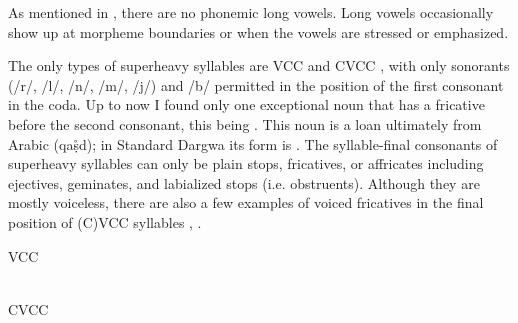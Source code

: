 As mentioned in , there are no phonemic long vowels. Long vowels occasionally show up at morpheme boundaries or when the vowels are stressed or emphasized.

The only types of superheavy syllables are VCC  and CVCC , with only sonorants (/r/, /l/, /n/, /m/, /j/) and /b/ permitted in the position of the first consonant in the coda. Up to now I found only one exceptional noun that has a fricative before the second consonant, this being  . This noun is a loan ultimately from Arabic (qaṣ̊d); in Standard Dargwa its form is . The syllable-final consonants of superheavy syllables can only be plain stops, fricatives, or affricates including ejectives, geminates, and labialized stops (i.e. obstruents). Although they are mostly voiceless, there are also a few examples of voiced fricatives in the final position of (C)VCC syllables , .
%
\begin{exe}
\TabPositions{13em}
	\ex	VCC	\label{ex:syllable VCC phon}\\
		 	\tab 		{} 	\\
		 	\tab 		{} 	
\end{exe}

\begin{exe}
\TabPositions{13em}
	\ex	CVCC	\label{ex:syllable CVCC phon}\\
		 	\tab 		{} 	\\
		  	\tab 		{} 	\\
		 	\tab 		{} 	\\
		 	\tab 		{} 	\\
		 	\tab 		{}  	\\
		 	\tab 		{} 	\\
		 	
\end{exe}
 
